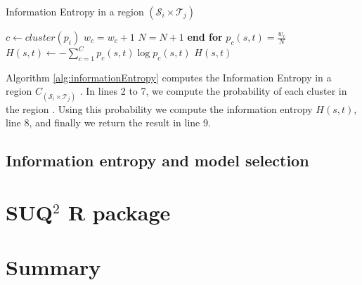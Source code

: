 \begin{algorithm} 
\caption{Information Entropy in a region $(\mathcal{S}_{i} \times \mathcal{T}_{j})$}\label{alg:informationEntropy}
\begin{algorithmic}[1] 
\State $c \gets cluster(p_i)$
\State $w_c= w_c+1$
\State $N=N+1$
\EndFor
\State \textbf{end for}
\State $p_{c}(s,t)= \frac{w_c}{N}$
\State $H(s, t) \gets -\sum_{c=1}^C p_{c}(s,t)\log p_{c}(s,t)$
\State \Return $H(s, t)$
\EndFunction 
\end{algorithmic} 
\end{algorithm} 


Algorithm \ref{alg:informationEntropy}  computes the Information Entropy in a region $C_{(\mathcal{S}_{i} \times \mathcal{T}_{j})}$ . In lines 2 to 7, we compute the probability of each cluster in the region . Using this probability we compute the information entropy $H(s, t)$, line 8, and finally we return the result in line 9.

\subsection{Information entropy and model selection}

\section{SUQ$^2$ R package}

\section{Summary}\label{sec:approach_summary}